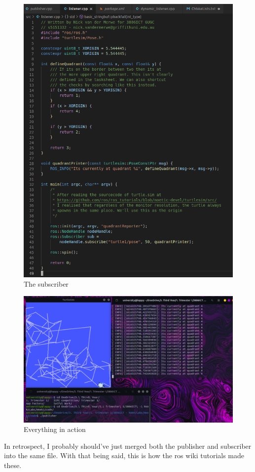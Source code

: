 \documentclass{article}
\begin{document}
\begin{figure}[h]
    \caption{The subscriber}
    \centering
    \includegraphics[width=1\textwidth]{img/listener.png}
\end{figure}

\begin{figure}[ht]
    \caption{Everything in action}
    \centering
    \includegraphics[width=1\textwidth]{img/inAction.png}
\end{figure}

In retrospect, I probably should've just merged both the publisher and subscriber into the same file. With that being said, this is how the ros wiki tutorials made these.
\end{document}
